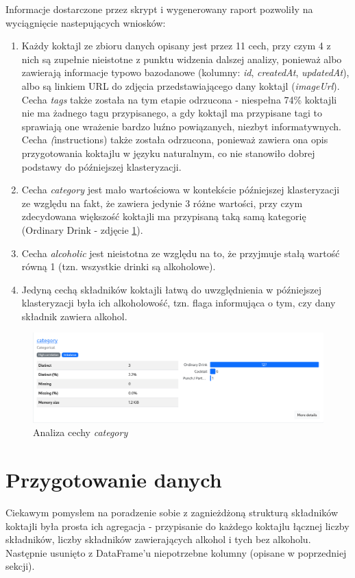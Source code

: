 \documentclass{article}
\begin{document}
    Informacje dostarczone przez skrypt i wygenerowany raport pozwoliły na wyciągnięcie nastepujących wniosków:
    \begin{enumerate}
        \item Każdy koktajl ze zbioru danych opisany jest przez 11 cech, przy czym 4 z nich są zupełnie nieistotne z punktu widzenia dalszej analizy, ponieważ albo zawierają informacje typowo bazodanowe (kolumny: \textit{id}, \textit{createdAt}, \textit{updatedAt}), albo są linkiem URL do zdjęcia przedstawiającego dany koktajl (\textit{imageUrl}). Cecha \textit{tags} także została na tym etapie odrzucona - niespełna 74\% koktajli nie ma żadnego tagu przypisanego, a gdy koktajl ma przypisane tagi to sprawiają one wrażenie bardzo luźno powiązanych, niezbyt informatywnych. Cecha \textit(instructions) także została odrzucona, ponieważ zawiera ona opis przygotowania koktajlu w języku naturalnym, co nie stanowiło dobrej podstawy do późniejszej klasteryzacji.
        \item Cecha \textit{category} jest mało wartościowa w kontekście późniejszej klasteryzacji ze względu na fakt, że zawiera jedynie 3 różne wartości, przy czym zdecydowana większość koktajli ma przypisaną taką samą kategorię (Ordinary Drink - zdjęcie \ref{fig:category}).
        \item Cecha \textit{alcoholic} jest nieistotna ze względu na to, że przyjmuje stałą wartość równą 1 (tzn. wszystkie drinki są alkoholowe).
        \item Jedyną cechą składników koktajli łatwą do uwzględnienia w późniejszej klasteryzacji była ich alkoholowość, tzn. flaga informująca o tym, czy dany składnik zawiera alkohol.
    \end{enumerate}

    \begin{figure}[!htbp]%
        \centering
        \includegraphics[width=\textwidth]{category_eda.png}
        \caption{Analiza cechy \textit{category}}%
        \label{fig:category}
    \end{figure}


\section{Przygotowanie danych}
Ciekawym pomysłem na poradzenie sobie z zagnieżdżoną strukturą składników koktajli była prosta ich agregacja - przypisanie do każdego koktajlu łącznej liczby składników, liczby składników zawierających alkohol i tych bez alkoholu.
Następnie usunięto z DataFrame'u niepotrzebne kolumny (opisane w poprzedniej sekcji).
\end{document}
